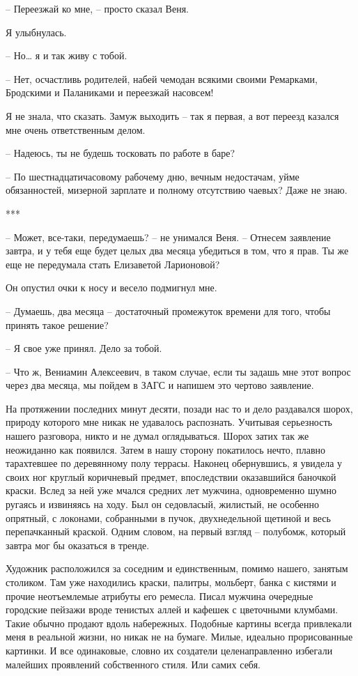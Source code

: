 \documentclass[
]{book}
\begin{document}
-- Переезжай ко мне, -- просто сказал Веня.

Я улыбнулась.

-- Но\ldots{} я и так живу с тобой.

-- Нет, осчастливь родителей, набей чемодан всякими своими Ремарками, Бродскими и Паланиками и переезжай насовсем!

Я не знала, что сказать. Замуж выходить -- так я первая, а вот переезд казался мне очень ответственным делом.

-- Надеюсь, ты не будешь тосковать по работе в баре?

-- По шестнадцатичасовому рабочему дню, вечным недостачам, уйме обязанностей, мизерной зарплате и полному отсутствию чаевых? Даже не знаю.

***

-- Может, все-таки, передумаешь? -- не унимался Веня. -- Отнесем заявление завтра, и у тебя еще будет целых два месяца убедиться в том, что я прав. Ты же еще не передумала стать Елизаветой Ларионовой?

Он опустил очки к носу и весело подмигнул мне.

-- Думаешь, два месяца -- достаточный промежуток времени для того, чтобы принять такое решение?

-- Я свое уже принял. Дело за тобой.

-- Что ж, Вениамин Алексеевич, в таком случае, если ты задашь мне этот вопрос через два месяца, мы пойдем в ЗАГС и напишем это чертово заявление.

На протяжении последних минут десяти, позади нас то и дело раздавался шорох, природу которого мне никак не удавалось распознать. Учитывая серьезность нашего разговора, никто и не думал оглядываться. Шорох затих так же неожиданно как появился. Затем в нашу сторону покатилось нечто, плавно тарахтевшее по деревянному полу террасы. Наконец обернувшись, я увидела у своих ног круглый коричневый предмет, впоследствии оказавшийся баночкой краски. Вслед за ней уже мчался средних лет мужчина, одновременно шумно ругаясь и извиняясь на ходу. Был он седовласый, жилистый, не особенно опрятный, с локонами, собранными в пучок, двухнедельной щетиной и весь перепачканный краской. Одним словом, на первый взгляд -- полубомж, который завтра мог бы оказаться в тренде.

Художник расположился за соседним и единственным, помимо нашего, занятым столиком. Там уже находились краски, палитры, мольберт, банка с кистями и прочие неотъемлемые атрибуты его ремесла. Писал мужчина очередные городские пейзажи вроде тенистых аллей и кафешек с цветочными клумбами. Такие обычно продают вдоль набережных. Подобные картины всегда привлекали меня в реальной жизни, но никак не на бумаге. Милые, идеально прорисованные картинки. И все одинаковые, словно их создатели целенаправленно избегали малейших проявлений собственного стиля. Или самих себя.
\end{document}
